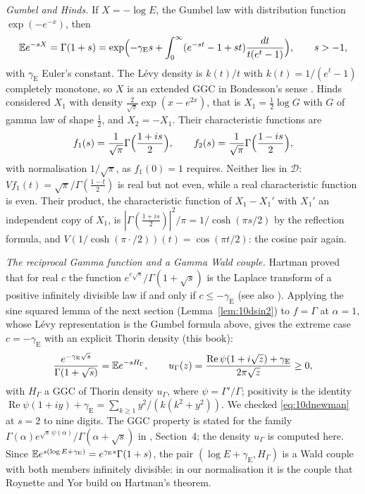 \emph{Gumbel and Hinds.} If $X = -\log E$, the Gumbel law with distribution function $\exp(-e^{-x})$, then
\[
\mathbb{E} e^{-sX} = \Gamma(1+s) = \exp\Bigl(-\gamma_{\mathrm E}s+\int_0^\infty(e^{-st}-1+st)\frac{dt}{t(e^t-1)}\Bigr),\qquad s>-1,
\]
with $\gamma_{\mathrm E}$ Euler's constant. The L\'evy density is $k(t)/t$ with $k(t) = 1/(e^t-1)$ completely monotone, so $X$ is an extended GGC in Bondesson's sense \cite{bondesson1992}. Hinds \cite{hinds1974} considered $X_1$ with density $\frac2{\sqrt\pi}\exp(x-e^{2x})$, that is $X_1 = \frac12\log G$ with $G$ of gamma law of shape $\frac12$, and $X_2 = -X_1$. Their characteristic functions are
\[
f_1(s) = \frac1{\sqrt\pi}\Gamma\Bigl(\frac{1+is}2\Bigr),\qquad f_2(s) = \frac1{\sqrt\pi}\Gamma\Bigl(\frac{1-is}2\Bigr),
\]
with normalisation $1/\sqrt\pi$, as $f_1(0)=1$ requires. Neither lies in $\mathcal D$: $Vf_1(t) = \sqrt\pi/\Gamma(\frac{1-t}2)$ is real but not even, while a real characteristic function is even. Their product, the characteristic function of $X_1-X_1'$ with $X_1'$ an independent copy of $X_1$, is $|\Gamma(\frac{1+is}2)|^2/\pi = 1/\cosh(\pi s/2)$ by the reflection formula, and $V(1/\cosh(\pi\cdot/2))(t) = \cos(\pi t/2)$: the cosine pair again.

\emph{The reciprocal Gamma function and a Gamma Wald couple.} Hartman \cite{hartman1976} proved that for real $c$ the function $e^{c\sqrt s}/\Gamma(1+\sqrt s)$ is the Laplace transform of a positive infinitely divisible law if and only if $c\le-\gamma_{\mathrm E}$ (see also \cite{roynetteyor2005}). Applying the sine squared lemma of the next section (Lemma~\ref{lem:10dsin2}) to $f=\Gamma$ at $\alpha=1$, whose L\'evy representation is the Gumbel formula above, gives the extreme case $c=-\gamma_{\mathrm E}$ with an explicit Thorin density (this book):
\begin{equation}\label{eq:10dnewman}
\frac{e^{-\gamma_{\mathrm E}\sqrt s}}{\Gamma(1+\sqrt s)} = \mathbb{E} e^{-sH_\Gamma},\qquad u_\Gamma(z) = \frac{\operatorname{Re}\psi(1+i\sqrt z)+\gamma_{\mathrm E}}{2\pi\sqrt z}\ge0,
\end{equation}
with $H_\Gamma$ a GGC of Thorin density $u_\Gamma$, where $\psi = \Gamma'/\Gamma$; positivity is the identity $\operatorname{Re}\psi(1+iy)+\gamma_{\mathrm E} = \sum_{k\ge1}y^2/(k(k^2+y^2))$. We checked \eqref{eq:10dnewman} at $s=2$ to nine digits. The GGC property is stated for the family $\Gamma(\alpha)e^{\sqrt s\,\psi(\alpha)}/\Gamma(\alpha+\sqrt s)$ in \cite{polson2018vdp}, Section~4; the density $u_\Gamma$ is computed here. Since $\mathbb{E} e^{s(\log E+\gamma_{\mathrm E})} = e^{\gamma_{\mathrm E}s}\Gamma(1+s)$, the pair $(\log E+\gamma_{\mathrm E},H_\Gamma)$ is a Wald couple with both members infinitely divisible: in our normalisation it is the couple that Roynette and Yor \cite{roynetteyor2005} build on Hartman's theorem.

